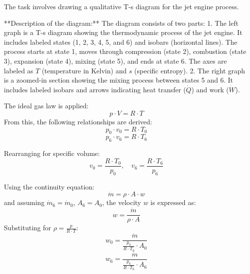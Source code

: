 The task involves drawing a qualitative T-s diagram for the jet engine process.  

**Description of the diagram:**  
The diagram consists of two parts:  
1. The left graph is a T-s diagram showing the thermodynamic process of the jet engine. It includes labeled states (1, 2, 3, 4, 5, and 6) and isobars (horizontal lines). The process starts at state 1, moves through compression (state 2), combustion (state 3), expansion (state 4), mixing (state 5), and ends at state 6. The axes are labeled as \( T \) (temperature in Kelvin) and \( s \) (specific entropy).  
2. The right graph is a zoomed-in section showing the mixing process between states 5 and 6. It includes labeled isobars and arrows indicating heat transfer (\( \dot{Q} \)) and work (\( \dot{W} \)).

The ideal gas law is applied:  
\[
p \cdot V = R \cdot T
\]  
From this, the following relationships are derived:  
\[
p_0 \cdot v_0 = R \cdot T_0
\]  
\[
p_6 \cdot v_6 = R \cdot T_6
\]  

Rearranging for specific volume:  
\[
v_0 = \frac{R \cdot T_0}{p_0}, \quad v_6 = \frac{R \cdot T_6}{p_6}
\]  

Using the continuity equation:  
\[
\dot{m} = \rho \cdot A \cdot w
\]  
and assuming \( \dot{m}_6 = \dot{m}_0 \), \( A_6 = A_0 \), the velocity \( w \) is expressed as:  
\[
w = \frac{\dot{m}}{\rho \cdot A}
\]  
Substituting for \( \rho = \frac{p}{R \cdot T} \):  
\[
w_0 = \frac{\dot{m}}{\frac{p_0}{R \cdot T_0} \cdot A_0}
\]  
\[
w_6 = \frac{\dot{m}}{\frac{p_6}{R \cdot T_6} \cdot A_6}
\]